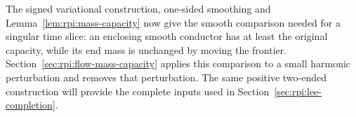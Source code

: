 The signed variational construction, one-sided smoothing and
Lemma~\ref{lem:rpi:mass-capacity} now give the smooth comparison
needed for a singular time slice: an enclosing smooth conductor has
at least the original capacity, while its end mass is unchanged by
moving the frontier. Section~\ref{sec:rpi:flow-mass-capacity} applies
this comparison to a small harmonic perturbation and removes that
perturbation. The same positive two-ended construction will provide
the complete inputs used in Section~\ref{sec:rpi:lee-completion}.
